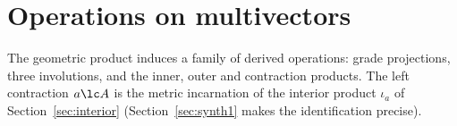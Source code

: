 \section{Operations on multivectors}\label{sec:ops}

The geometric product induces a family of derived operations: grade projections, three involutions, and the inner, outer and
contraction products. The left contraction $a\lc A$ is the metric incarnation of the interior product $\iota_a$ of
Section~\ref{sec:interior} (Section~\ref{sec:synth1} makes the identification precise).


